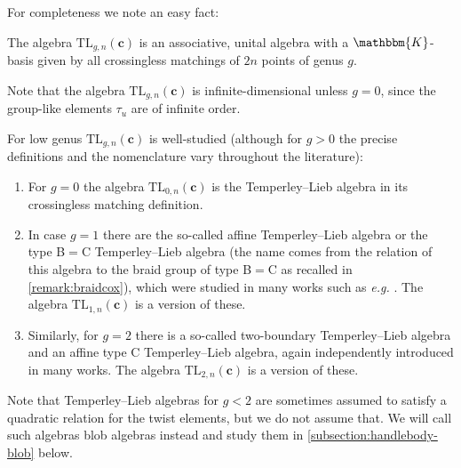 \documentclass[a4paper,11pt]{amsart}
\newcommand{\eg}{\textsl{e.g.}}
\newcommand{\setstuff}[1]{\mathrm{#1}}
\newcommand{\KK}{\mathbbm{K}}
\newcommand{\bsym}[1]{\boldsymbol{#1}}
\newcommand{\cpar}{\bsym{c}}
\numberwithin{equation}{section}
\let\fullref\autoref
\begin{document}
For completeness we note an easy fact:

\begin{lemmaqed}\label{lemma:tl-basis}
The algebra $\setstuff{TL}_{g,n}(\cpar)$ is an associative, unital 
algebra with a $\KK$-basis given by all crossingless 
matchings of $2n$ points of genus $g$.
\end{lemmaqed}

Note that the algebra $\setstuff{TL}_{g,n}(\cpar)$ is 
infinite-dimensional unless $g=0$, since the group-like elements $\tau_{u}$ 
are of infinite order.

\begin{remark}\label{remark:tl}
For low genus $\setstuff{TL}_{g,n}(\cpar)$ is well-studied 
(although for $g>0$ the precise definitions and the 
nomenclature vary 
throughout the literature):
\begin{enumerate}

\setlength\itemsep{0.15cm}

\item For $g=0$ the algebra 
$\setstuff{TL}_{0,n}(\cpar)$ is the 
Temperley--Lieb algebra in its crossingless matching definition.

\item In case $g=1$ there are the so-called 
affine Temperley--Lieb algebra or the
type B$=$C Temperley--Lieb algebra 
(the name comes from the relation of this algebra 
to the braid group of type B$=$C 
as recalled in \fullref{remark:braidcox}), 
which were studied in many works such as {\eg} \cite{GrLe-affine-tl}.
The algebra $\setstuff{TL}_{1,n}(\cpar)$ is a version of these.

\item Similarly, for 
$g=2$ there is a so-called two-boundary 
Temperley--Lieb algebra 
and an affine type C Temperley--Lieb 
algebra, again independently 
introduced in many works.
The algebra $\setstuff{TL}_{2,n}(\cpar)$ 
is a version of these.

\end{enumerate}
Note that Temperley--Lieb algebras for $g<2$
are sometimes assumed to satisfy a quadratic relation for the twist 
elements, but we do not assume that.
We will call such algebras blob algebras instead 
and study them in \fullref{subsection:handlebody-blob} below.
\end{remark}
\end{document}
